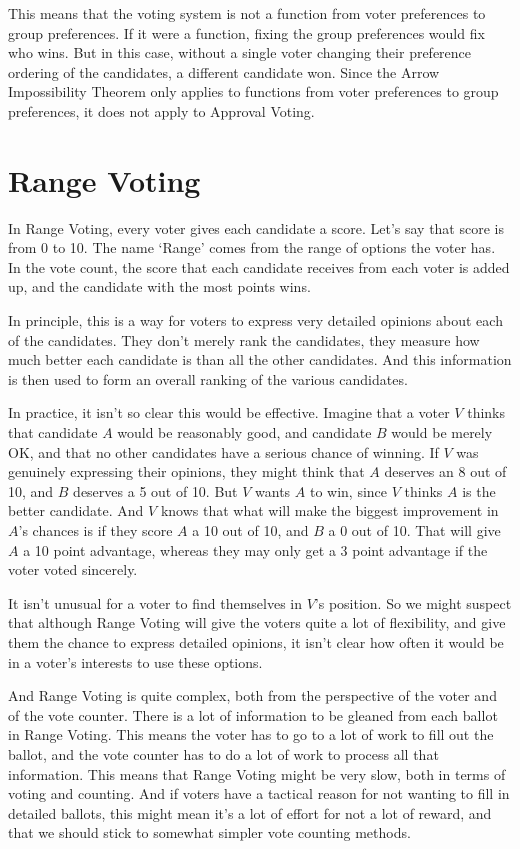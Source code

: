 \begin{multicols}{2}
This means that the voting system is not a function from voter preferences to group preferences. If it were a function, fixing the group preferences would fix who wins. But in this case, without a single voter changing their preference ordering of the candidates, a different candidate won. Since the Arrow Impossibility Theorem only applies to functions from voter preferences to group preferences, it does not apply to Approval Voting.

\section{Range Voting}
In Range Voting, every voter gives each candidate a score. Let's say that score is from 0 to 10. The name `Range' comes from the range of options the voter has. In the vote count, the score that each candidate receives from each voter is added up, and the candidate with the most points wins.

In principle, this is a way for voters to express very detailed opinions about each of the candidates. They don't merely rank the candidates, they measure how much better each candidate is than all the other candidates. And this information is then used to form an overall ranking of the various candidates.

In practice, it isn't so clear this would be effective. Imagine that a voter $V$ thinks that candidate $A$ would be reasonably good, and candidate $B$ would be merely OK, and that no other candidates have a serious chance of winning. If $V$ was genuinely expressing their opinions, they might think that $A$ deserves an 8 out of 10, and $B$ deserves a 5 out of 10. But $V$ wants $A$ to win, since $V$ thinks $A$ is the better candidate. And $V$ knows that what will make the biggest improvement in $A$'s chances is if they score $A$ a 10 out of 10, and $B$ a 0 out of 10. That will give $A$ a 10 point advantage, whereas they may only get a 3 point advantage if the voter voted sincerely.

It isn't unusual for a voter to find themselves in $V$'s position. So we might suspect that although Range Voting will give the voters quite a lot of flexibility, and give them the chance to express detailed opinions, it isn't clear how often it would be in a voter's interests to use these options.

And Range Voting is quite complex, both from the perspective of the voter and of the vote counter. There is a lot of information to be gleaned from each ballot in Range Voting. This means the voter has to go to a lot of work to fill out the ballot, and the vote counter has to do a lot of work to process all that information. This means that Range Voting might be very slow, both in terms of voting and counting. And if voters have a tactical reason for not wanting to fill in detailed ballots, this might mean it's a lot of effort for not a lot of reward, and that we should stick to somewhat simpler vote counting methods.

\end{multicols}

